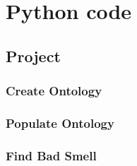 \documentclass [14 pt]{article}
\begin{document}
%

\newpage
\appendix

\section{Python code}

\subsection{Project}
\subsubsection{Create Ontology}

\subsubsection{Populate Ontology}

\subsubsection{Find Bad Smell}

\end{document}
